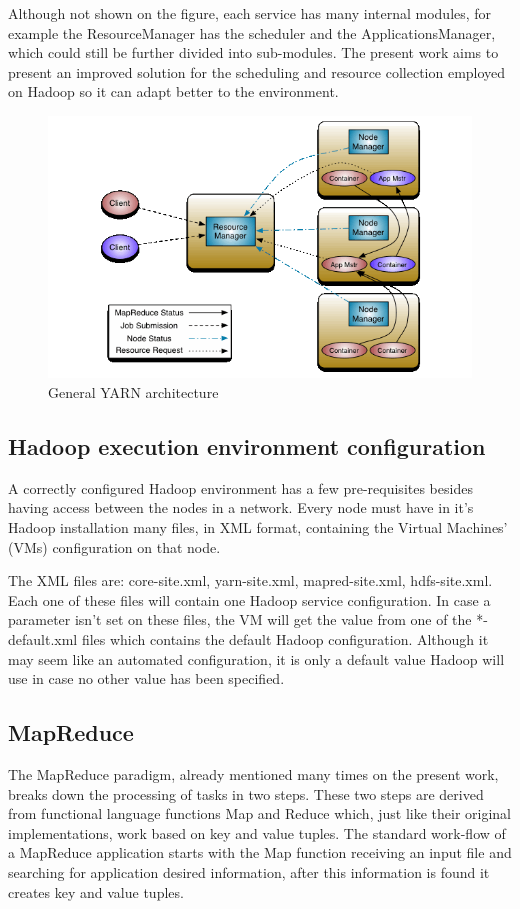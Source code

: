 Although not shown on the figure, each service has many internal modules, for example the ResourceManager has the scheduler and the ApplicationsManager, which could still be further divided into sub-modules. The present work aims to present an improved solution for the scheduling and resource collection employed on Hadoop so it can adapt better to the environment.

\begin{figure}[hbtn]
   \renewcommand{\figurename}{Figure}
   \centering
   \includegraphics[width=12cm]{figuras/Figura06-YarnArch.png}
   \caption{General YARN architecture \cite{YARN}}
   \label{fig:ArqYARN}
\end{figure}

\subsection{Hadoop execution environment configuration}
\label{sec:envconfig}
A correctly configured Hadoop environment has a few pre-requisites besides having access between the nodes in a network. Every node must have in it's Hadoop installation many files, in XML format, containing the Virtual Machines' (VMs) configuration on that node.

The XML files are: core-site.xml, yarn-site.xml, mapred-site.xml, hdfs-site.xml. Each one of these files will contain one Hadoop service configuration. In case a parameter isn't set on these files, the VM will get the value from one of the *-default.xml files which contains the default Hadoop configuration. Although it may seem like an automated configuration, it is only a default value Hadoop will use in case no other value has been specified.

\subsection{MapReduce}
The MapReduce paradigm, already mentioned many times on the present work, breaks down the processing of tasks in two steps. These two steps are derived from functional language functions Map and Reduce which, just like their original implementations, work based on key and value tuples. The standard work-flow of a MapReduce application starts with the Map function receiving an input file and searching for application desired information, after this information is found it creates key and value tuples. 

